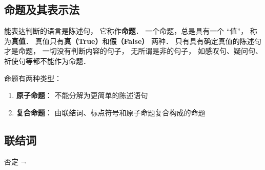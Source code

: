 \subsection{命题及其表示法}



\begin{definition}{}
能表达判断的语言是陈述句， 它称作\textbf{命题}． 一个命题，总是具有一个 “值”， 称为\textbf{真值}． 真值只有\textbf{真（True）}和\textbf{假（False）} 两种． 只有具有确定真值的陈述句才是命题， 一切没有判断内容的句子， 无所谓是非的句子， 如感叹句、疑问句、祈使句等都不能作为命题．
\end{definition}

命题有两种类型：
\begin{enumerate}
\item \textbf{原子命题}： 不能分解为更简单的陈述语句
\item \textbf{复合命题}： 由联结词、标点符号和原子命题复合构成的命题
\end{enumerate} 

\subsection{联结词}
\begin{definition}{否定 $\neg$} \end{definition} 
